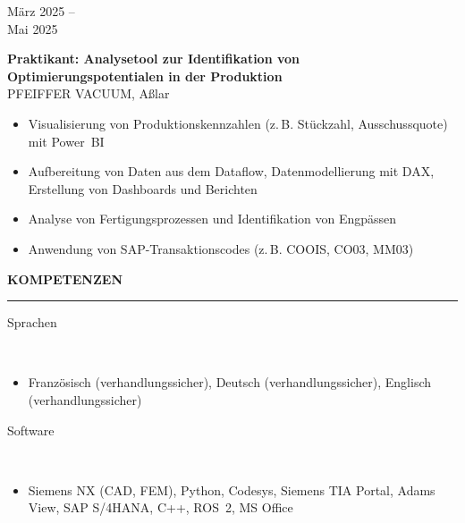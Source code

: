 \documentclass[11pt,a4paper]{article}
\newcommand{\sectionhead}[1]{%
  \vspace{1.1em}
  {\large\bfseries\color{accent}\MakeUppercase{#1}}\\[-0.35em]
  {\color{accent!50}\rule{\linewidth}{0.5pt}}\vspace{0.5em}}
\newcommand{\entry}[4]{%
  \noindent
  \begin{minipage}[t]{2.9cm}\raggedright\small\color{lightgray}#1\end{minipage}%
  \hspace{0.3cm}%
  \begin{minipage}[t]{\dimexpr\linewidth-3.2cm\relax}
    {\normalsize\bfseries\color{black!90}#2}\\[-0.1em]
    {\small\color{accent}#3}
    \begin{itemize}[leftmargin=1.1em,itemsep=0.1em,topsep=0.3em,parsep=0pt,label={\tiny$\bullet$}]
      \small #4
    \end{itemize}
  \end{minipage}\par\vspace{0.55em}}
\begin{document}
\entry{März 2025 --\\ Mai 2025}
{Praktikant: Analysetool zur Identifikation von Optimierungspotentialen in der Produktion}
{PFEIFFER VACUUM, Aßlar}
{\item Visualisierung von Produktionskennzahlen (z.\,B. Stückzahl, Ausschussquote) mit Power~BI
 \item Aufbereitung von Daten aus dem Dataflow, Datenmodellierung mit DAX, Erstellung von Dashboards und Berichten
 \item Analyse von Fertigungsprozessen und Identifikation von Engpässen
 \item Anwendung von SAP-Transaktionscodes (z.\,B. COOIS, CO03, MM03)}

\sectionhead{Kompetenzen}

\entry{Sprachen}{}{}
{\item Französisch (verhandlungssicher), Deutsch (verhandlungssicher), Englisch (verhandlungssicher)}

\entry{Software}{}{}
{\item Siemens NX (CAD, FEM), Python, Codesys, Siemens TIA Portal, Adams View, SAP S/4HANA, C++, ROS~2, MS Office}
\end{document}
